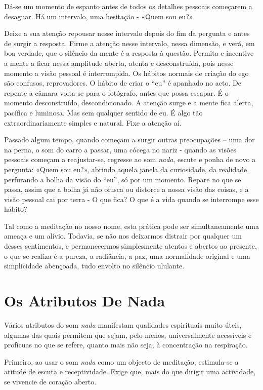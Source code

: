 Dá-se um momento de espanto antes de todos os detalhes pessoais
começarem a desaguar. Há um intervalo, uma hesitação - «Quem sou eu?»

Deixe a sua atenção repousar nesse intervalo depois do fim da pergunta e
antes de surgir a resposta. Firme a atenção nesse intervalo, nessa
dimensão, e verá, em boa verdade, que o silêncio da mente é a resposta à
questão. Permita e incentive a mente a ficar nessa amplitude aberta,
atenta e desconstruída, pois nesse momento a visão pessoal é
interrompida. Os hábitos normais de criação do ego são confusos,
reprovadores. O hábito de criar o ``eu'' é apanhado no acto. De repente
a câmara volta-se para o fotógrafo, antes que possa escapar. É o momento
desconstruído, descondicionado. A atenção surge e a mente fica alerta,
pacífica e luminosa. Mas sem qualquer sentido de eu. É algo tão
extraordinariamente simples e natural. Fixe a atenção aí.

Passado algum tempo, quando começam a surgir outras preocupações -- uma
dor na perna, o som do carro a passar, uma cócega no nariz - quando as
visões pessoais começam a reajustar-se, regresse ao som \emph{nada},
escute e ponha de novo a pergunta: «Quem sou eu?», abrindo aquela janela
da curiosidade, da realidade, perfurando a bolha da visão do ``eu'', só
por um momento. Repare no que se passa, assim que a bolha já não ofusca
ou distorce a nossa visão das coisas, e a visão pessoal cai por terra -
O que fica? O que é a vida quando se interrompe esse hábito?

Tal como a meditação no nosso nome, esta prática pode ser
simultaneamente uma ameaça e um alívio. Todavia, se não nos deixarmos
distrair por qualquer um desses sentimentos, e permanecermos
simplesmente atentos e abertos ao presente, o que se realiza é a pureza,
a radiância, a paz, uma normalidade original e uma simplicidade
abençoada, tudo envolto no silêncio ululante.

\section{Os Atributos De Nada}

Vários atributos do som \emph{nada} manifestam qualidades espirituais
muito úteis, algumas das quais permitem que sejam, pelo menos,
universalmente acessíveis e profícuas no que se refere, quanto mais não
seja, à concentração na respiração.

Primeiro, ao usar o som \emph{nada} como um objecto de meditação,
estimula-se a atitude de escuta e receptividade. Exige que, mais do que
dirigir uma actividade, se vivencie de coração aberto.


